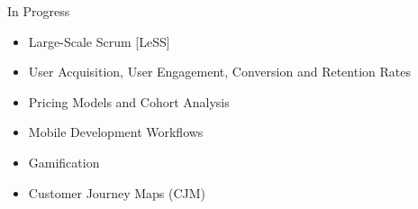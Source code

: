 %
In Progress %
  \begin{itemize}
    \setlength\itemsep{-0.3em}
\item Large-Scale Scrum [LeSS]
\item User Acquisition, User Engagement, %
Conversion and Retention Rates %
\item Pricing Models and Cohort Analysis
\item Mobile Development Workflows
\item Gamification
\item Customer Journey Maps (CJM)
\end{itemize}





